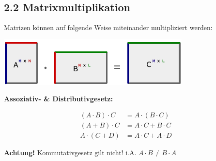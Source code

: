 \subsection{2.2 Matrixmultiplikation}{
\vskip1pt
Matrizen können auf folgende Weise miteinander multipliziert werden:

\begin{center}
\end{center}

\vspace{-2mm}

\begin{center}
\includegraphics[width = 0.95 \columnwidth]{2_Matrizen/Matrixmultiplikation.pdf}
\end{center}



\textbf{Assoziativ- \& Distributivgesetz:}

\vspace{-6mm}
\begin{center}
\parskip3pt
\begin{align}
(A\cdot B) \cdot C &= A \cdot (B \cdot C) \nonumber \\
(A + B) \cdot C &= A \cdot C + B \cdot C \nonumber \\
A \cdot (C + D) &= A \cdot C + A \cdot D \nonumber
 \end{align}
\end{center}
\textbf{Achtung!} Kommutativgesetz gilt nicht! i.A. $A\cdot B \neq B \cdot A$
}
\WhiteSpace
